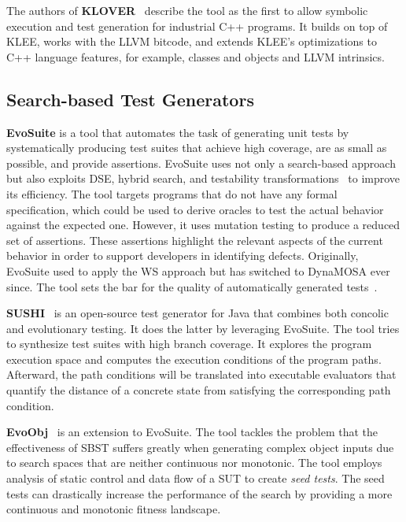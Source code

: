 \documentclass{article}
\begin{document}
The authors of \textbf{KLOVER}~\cite{Li2011} describe the tool as the first to allow symbolic execution and test generation for industrial C++ programs. It builds on top of KLEE, works with the LLVM bitcode, and extends KLEE's optimizations to C++ language features, for example, classes and objects and LLVM intrinsics.


\subsection{Search-based Test Generators}
\textbf{EvoSuite} is a tool that automates the task of generating unit tests by systematically producing test suites that achieve high coverage, are as small as possible, and provide assertions. EvoSuite uses not only a search-based approach but also exploits \ac{DSE}, hybrid search, and testability transformations~\cite{Harman2004} to improve its efficiency. The tool targets programs that do not have any formal specification, which could be used to derive oracles to test the actual behavior against the expected one. However, it uses mutation testing to produce a reduced set of assertions. These assertions highlight the relevant aspects of the current behavior in order to support developers in identifying defects. Originally, EvoSuite used to apply the \ac{WS} approach but has switched to \ac{DynaMOSA} ever since. The tool sets the bar for the quality of automatically generated tests~\cite{Vogl2021,Panichella2020,Campos2019,Fraser2018,Fraser2016,Fraser2017}.

\textbf{SUSHI}~\cite{Braione2018} is an open-source test generator for Java that combines both concolic and evolutionary testing. It does the latter by leveraging EvoSuite. The tool tries to synthesize test suites with high branch coverage. It explores the program execution space and computes the execution conditions of the program paths. Afterward, the path conditions will be translated into executable evaluators that quantify the distance of a concrete state from satisfying the corresponding path condition. 

\textbf{EvoObj}~\cite{Lin2021} is an extension to EvoSuite. The tool tackles the problem that the effectiveness of \ac{SBST} suffers greatly when generating complex object inputs due to search spaces that are neither continuous nor monotonic. The tool employs analysis of static control and data flow of a \ac{SUT} to create \textit{seed tests}. The seed tests can drastically increase the performance of the search by providing a more continuous and monotonic fitness landscape. 
\end{document}
